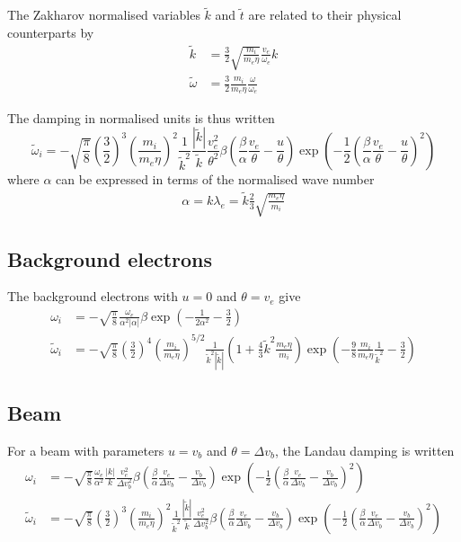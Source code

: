 \documentclass[10pt,a4paper]{article}
\begin{document}
The Zakharov normalised variables  $\tilde{k}$ and $\tilde{t}$ are related
to their physical counterparts by
\begin{align*}
\tilde{k}&=\frac{3}{2}\sqrt{\frac{m_i}{m_e\eta}}\frac{v_e}{\omega_e}k\\
\tilde{\omega}&=\frac{3}{2}\frac{m_i}{m_e\eta}\frac{\omega}{\omega_e}
\end{align*}

The damping in normalised units is thus written
\begin{equation}
\tilde{\omega}_i=-\sqrt{\frac{\pi}{8}}
\left(\frac{3}{2}\right)^3\left(\frac{m_i}{m_e\eta}\right)^2
\frac{1}{\tilde{k}^2}\frac{|\tilde{k}|}{\tilde{k}}\frac{v_e^2}{\theta^2}
\beta\left(\frac{\beta}{\alpha}\frac{v_e}{\theta}-\frac{u}{\theta}\right)
\exp\left(-\frac{1}{2}\left(
\frac{\beta}{\alpha}\frac{v_e}{\theta}-\frac{u}{\theta}
\right)^2\right)
\end{equation}
where $\alpha$ can be expressed in terms of the normalised wave number
\begin{align*}
\alpha = k\lambda_e=\tilde{k}\frac{2}{3}\sqrt{\frac{m_e\eta}{m_i}}
\end{align*}

\subsection{Background electrons}
The background electrons with $u=0$ and $\theta=v_e$ give
\begin{align}
\omega_i&=-\sqrt{\frac{\pi}{8}}\frac{\omega_e}{\alpha^2|\alpha|}
\beta\exp\left(-\frac{1}{2\alpha^2}-\frac{3}{2}\right)\\
\tilde{\omega}_i&=-\sqrt{\frac{\pi}{8}}
\left(\frac{3}{2}\right)^4\left(\frac{m_i}{m_e\eta}\right)^{5/2}
\frac{1}{\tilde{k}^2|\tilde{k}|}
\left(1+\frac{4}{3}\tilde{k}^2\frac{m_e\eta}{m_i}\right)
\exp\left(-\frac{9}{8}\frac{m_i}{m_e\eta}\frac{1}{\tilde{k}^2}-
\frac{3}{2}\right)
\end{align}

\subsection{Beam}
For a beam with parameters $u=v_b$ and $\theta=\Delta v_b$,
the Landau damping is written
\begin{align}
\omega_i&=-\sqrt{\frac{\pi}{8}}\frac{\omega_e}{\alpha^2}\frac{|k|}{k}
\frac{v_e^2}{\Delta v_b^2}\beta
\left(\frac{\beta}{\alpha}\frac{v_e}{\Delta v_b}-
\frac{v_b}{\Delta v_b}\right)
\exp\left(-\frac{1}{2}\left(
\frac{\beta}{\alpha}\frac{v_e}{\Delta v_b}-\frac{v_b}{\Delta v_b}
\right)^2\right)\\
\tilde{\omega}_i&=-\sqrt{\frac{\pi}{8}}
\left(\frac{3}{2}\right)^3\left(\frac{m_i}{m_e\eta}\right)^2
\frac{1}{\tilde{k}^2}\frac{|\tilde{k}|}{\tilde{k}}
\frac{v_e^2}{\Delta v_b^2}\beta
\left(\frac{\beta}{\alpha}\frac{v_e}{\Delta v_b}-
\frac{v_b}{\Delta v_b}\right)
\exp\left(-\frac{1}{2}\left(
\frac{\beta}{\alpha}\frac{v_e}{\Delta v_b}-\frac{v_b}{\Delta v_b}
\right)^2\right)
\end{align}
\end{document}

